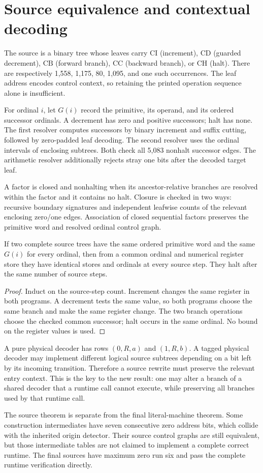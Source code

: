 \section{Source equivalence and contextual decoding}\label{sec:method}
The source is a binary tree whose leaves carry \(\mathrm{CI}\) (increment),
\(\mathrm{CD}\) (guarded decrement), \(\mathrm{CB}\) (forward branch),
\(\mathrm{CC}\) (backward branch), or \(\mathrm{CH}\) (halt).
There are respectively 1,558, 1,175, 80, 1,095, and one such occurrences.
The leaf address encodes control context, so retaining the printed operation
sequence alone is insufficient.

For ordinal \(i\), let \(G(i)\) record the primitive, its operand, and its ordered
successor ordinals. A decrement has zero and positive successors; halt has
none. The first resolver computes successors by binary increment and suffix
cutting, followed by zero-padded leaf decoding. The second resolver uses the
ordinal intervals of enclosing subtrees. Both check all 5,083 nonhalt
successor edges. The arithmetic resolver additionally rejects stray one bits
after the decoded target leaf.

A factor is closed and nonhalting when its ancestor-relative branches are
resolved within the factor and it contains no halt. Closure is checked in
two ways: recursive boundary signatures and independent leafwise counts of
the relevant enclosing zero/one edges. Association of closed sequential
factors preserves the primitive word and resolved ordinal control graph.

\begin{lemma}\label{lem:source}
If two complete source trees have the same ordered primitive word and the
same \(G(i)\) for every ordinal, then from a common ordinal and numerical
register store they have identical stores and ordinals at every source step.
They halt after the same number of source steps.
\end{lemma}
\begin{proof}
Induct on the source-step count. Increment changes the same register in both
programs. A decrement tests the same value, so both programs choose the same
branch and make the same register change. The two branch operations choose
the checked common successor; halt occurs in the same ordinal. No bound on
the register values is used.
\end{proof}

A pure physical decoder has rows \((0,R,a)\) and \((1,R,b)\).
A tagged physical decoder may implement different logical source subtrees
depending on a bit left by its incoming transition. Therefore a source rewrite
must preserve the relevant entry context. This is the key to the new result:
one may alter a branch of a shared decoder that a runtime call cannot execute,
while preserving all branches used by that runtime call.

The source theorem is separate from the final literal-machine theorem.
Some construction intermediates have seven consecutive zero address bits,
which collide with the inherited origin detector. Their source control graphs
are still equivalent, but those intermediate tables are not claimed to
implement a complete correct runtime. The final sources have maximum zero
run six and pass the complete runtime verification directly.
